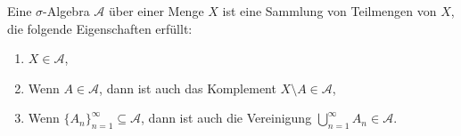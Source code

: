 \begin{definition}
    Eine $\sigma$-Algebra $\mathcal{A}$ über einer Menge $X$ ist eine Sammlung von Teilmengen von $X$, die folgende Eigenschaften erfüllt:
    \begin{enumerate}
        \item $X \in \mathcal{A}$,
        \item Wenn $A \in \mathcal{A}$, dann ist auch das Komplement $X \setminus A \in \mathcal{A}$,
        \item Wenn $\{A_n\}_{n=1}^{\infty} \subseteq \mathcal{A}$, dann ist auch die Vereinigung $\bigcup_{n=1}^{\infty} A_n \in \mathcal{A}$.
    \end{enumerate}
\end{definition}